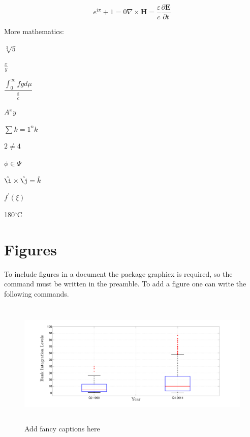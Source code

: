 \documentclass[a4paper,12pt]{article}
\begin{document}
\begin{subequations}
	\begin{equation}
	e^{i\pi} + 1 = 0
	\label{1a}
	\end{equation}
	\begin{equation}
	\nabla \times \mathbf{H} = \frac{\varepsilon}{c} \frac{\partial \mathbf{E}}{\partial{t}}
	\label{1b}
	\end{equation}
	\label{1}
\end{subequations}

More mathematics:


$\sqrt[3]{5}$

$\frac{x}{y}$

$\dfrac{\displaystyle\int_{0}^{\infty}fg d\mu}{\frac{\varepsilon}{c}}$

$A^{x} {y}$

$\sum {k=1}^n k$

$2 \ne 4$

$\phi \in \Psi$

$\hat{\i} \times \hat{\j} = \hat{k}$

$f^{\prime}(\xi)$

180$^{\circ}$C


\section{Figures}

To include figures in a document the package graphicx is required, so the command
must be written in the preamble. To add a figure one can
write the following commands.

 \begin{figure}[h!tbp] %
 	\centering
 	\includegraphics[width=12cm,height=6cm]{Boxplot_Integration.pdf}
 	\caption{Add fancy captions here}
 	\label{Fig:Label_Boxplot} 
 \end{figure}
\end{document}
